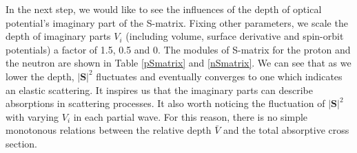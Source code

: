 	In the next step, we would like to see the influences of the depth of optical potential's imaginary part of the S-matrix. Fixing other parameters, we scale the depth of imaginary parts $V_i$ (including volume, surface derivative and spin-orbit potentials) a factor of 1.5, 0.5 and 0. The modules of S-matrix for the proton and the neutron are shown in Table \ref{pSmatrix} and \ref{nSmatrix}. 
	We can see that as we lower the depth, $|\mathbf{S}|^2$ fluctuates and eventually converges to one which indicates an elastic scattering. It inspires us that the imaginary parts can describe absorptions in scattering processes. It also worth noticing the fluctuation of $|\mathbf{S}|^2$ with varying $V_i$ in each partial wave. For this reason, there is no simple monotonous relations between the relative depth $\bar{V}$ and the total absorptive cross section.

